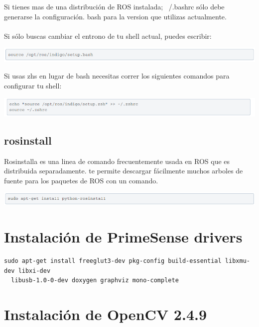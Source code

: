 \documentclass[user_manual.tex]{subfiles}
\begin{document}
Si tienes mas de una distribución de ROS instalada; ~/.bashrc sólo debe generarse la configuración. bash para 
la version que utilizas actualmente.\\
\\
Si sólo buscas cambiar el entrono de tu shell actual, puedes escribir:

\begin{center}
\includegraphics[width=1\textwidth]{Figures/Software/Install_ROS/Paso_15.png}
\end{center}

Si usas zhs en lugar de bash necesitas correr los siguientes comandos para configurar tu shell:

\begin{center}
\includegraphics[width=1\textwidth]{Figures/Software/Install_ROS/Paso_16.png}
\end{center}

\subsection{rosinstall}

Rosinstalla es una linea de comando frecuentemente usada en ROS que es distribuida separadamente. te permite 
descargar fácilmente muchos arboles de fuente para los paquetes de ROS con un comando.

\begin{center}
\includegraphics[width=1\textwidth]{Figures/Software/Install_ROS/Paso_17.png}
\end{center}

\section{Instalación de PrimeSense drivers}

\begin{Verbatim}[fontsize=\footnotesize]
  sudo apt-get install freeglut3-dev pkg-config build-essential libxmu-dev libxi-dev
  libusb-1.0-0-dev doxygen graphviz mono-complete
\end{Verbatim}
\section{Instalación de OpenCV 2.4.9}
\end{document}
